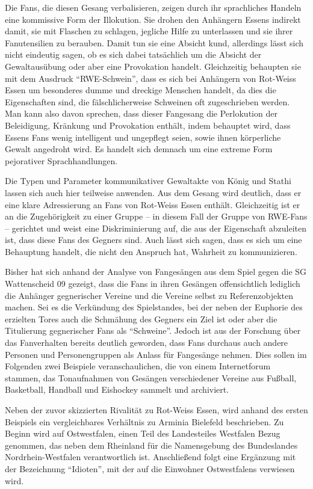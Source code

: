 Die Fans, die diesen Gesang verbalisieren, zeigen durch ihr sprachliches Handeln eine kommissive Form der Illokution.
Sie drohen den Anhängern Essens indirekt damit, sie mit Flaschen zu schlagen, jegliche Hilfe zu unterlassen und sie ihrer Fanutensilien zu berauben.
Damit tun sie eine Absicht kund, allerdings lässt sich nicht eindeutig sagen, ob es sich dabei tatsächlich um die Absicht der Gewaltausübung oder aber eine Provokation handelt.
Gleichzeitig behaupten sie mit dem Ausdruck "`RWE-Schwein"', dass es sich bei Anhängern von Rot-Weiss Essen um besonderes dumme und dreckige Menschen handelt, da dies die Eigenschaften sind, die fälschlicherweise Schweinen oft zugeschrieben werden.
Man kann also davon sprechen, dass dieser Fangesang die Perlokution der Beleidigung, Kränkung und Provokation enthält, indem behauptet wird, dass Essens Fans wenig intelligent und ungepflegt seien, sowie ihnen körperliche Gewalt angedroht wird.
Es handelt sich demnach um eine extreme Form pejorativer Sprachhandlungen.

Die Typen und Parameter kommunikativer Gewaltakte von König und Stathi lassen sich auch hier teilweise anwenden.
Aus dem Gesang wird deutlich, dass er eine klare Adressierung an Fans von Rot-Weiss Essen enthält.
Gleichzeitig ist er an die Zugehörigkeit zu einer Gruppe – in diesem Fall der Gruppe von RWE-Fans – gerichtet und weist eine Diskriminierung auf, die aus der Eigenschaft abzuleiten ist, dass diese Fans des Gegners sind.
Auch lässt sich sagen, dass es sich um eine Behauptung handelt, die nicht den Anspruch hat, Wahrheit zu kommunizieren.

Bisher hat sich anhand der Analyse von Fangesängen aus dem Spiel gegen die SG Wattenscheid 09 gezeigt, dass die Fans in ihren Gesängen offensichtlich lediglich die Anhänger gegnerischer Vereine und die Vereine selbst zu Referenzobjekten machen.
Sei es die Verkündung des Spielstandes, bei der neben der Euphorie des erzielten Tores auch die Schmähung des Gegners ein Ziel ist oder aber die Titulierung gegnerischer Fans als "`Schweine"'.
Jedoch ist aus der Forschung über das Fanverhalten bereits deutlich geworden, dass Fans durchaus auch andere Personen und Personengruppen als Anlass für Fangesänge nehmen.
Dies sollen im Folgenden zwei Beispiele veranschaulichen, die von einem Internetforum stammen, das Tonaufnahmen von Gesängen verschiedener Vereine aus Fußball, Basketball, Handball und Eishockey sammelt und archiviert.

Neben der zuvor skizzierten Rivalität zu Rot-Weiss Essen, wird anhand des ersten Beispiels ein vergleichbares Verhältnis zu Arminia Bielefeld beschrieben.
Zu Beginn wird auf Ostwestfalen, einen Teil des Landesteiles Westfalen Bezug genommen, das neben dem Rheinland für die Namensgebung des Bundeslandes Nordrhein-Westfalen verantwortlich ist.
Anschließend folgt eine Ergänzung mit der Bezeichnung "`Idioten"', mit der auf die Einwohner Ostwestfalens verwiesen wird.

